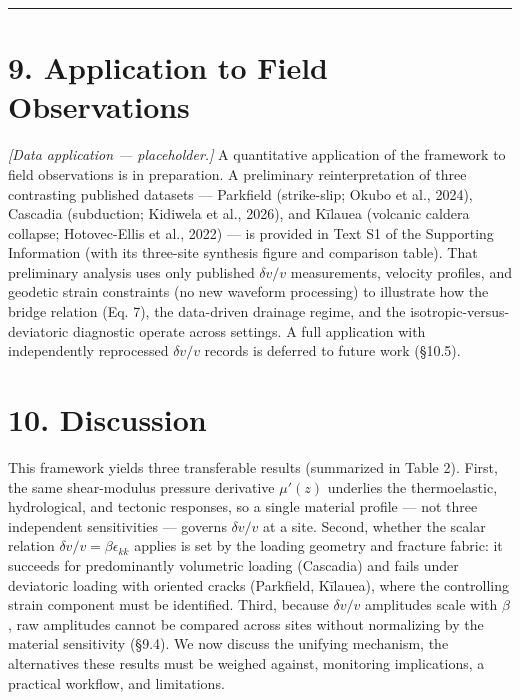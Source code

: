 \documentclass[draft]{agujournal2019}
\begin{document}
\begin{center}\rule{0.5\linewidth}{0.5pt}\end{center}

\section{9. Application to Field
Observations}\label{application-to-field-observations}

\emph{{[}Data application --- placeholder.{]}} A quantitative
application of the framework to field observations is in preparation. A
preliminary reinterpretation of three contrasting published datasets ---
Parkfield (strike-slip; Okubo et al., 2024), Cascadia (subduction;
Kidiwela et al., 2026), and Kīlauea (volcanic caldera collapse;
Hotovec-Ellis et al., 2022) --- is provided in Text S1 of the Supporting
Information (with its three-site synthesis figure and comparison table).
That preliminary analysis uses only published \(\delta v/v\)
measurements, velocity profiles, and geodetic strain constraints (no new
waveform processing) to illustrate how the bridge relation (Eq. 7), the
data-driven drainage regime, and the isotropic-versus-deviatoric
diagnostic operate across settings. A full application with
independently reprocessed \(\delta v/v\) records is deferred to future
work (§10.5).

\section{10. Discussion}\label{discussion}

This framework yields three transferable results (summarized in Table
2). First, the same shear-modulus pressure derivative \(\mu'(z)\)
underlies the thermoelastic, hydrological, and tectonic responses, so a
single material profile --- not three independent sensitivities ---
governs \(\delta v/v\) at a site. Second, whether the scalar relation
\(\delta v/v = \beta\epsilon_{kk}\) applies is set by the loading
geometry and fracture fabric: it succeeds for predominantly volumetric
loading (Cascadia) and fails under deviatoric loading with oriented
cracks (Parkfield, Kīlauea), where the controlling strain component must
be identified. Third, because \(\delta v/v\) amplitudes scale with
\(\beta\), raw amplitudes cannot be compared across sites without
normalizing by the material sensitivity (§9.4). We now discuss the
unifying mechanism, the alternatives these results must be weighed
against, monitoring implications, a practical workflow, and limitations.
\end{document}
